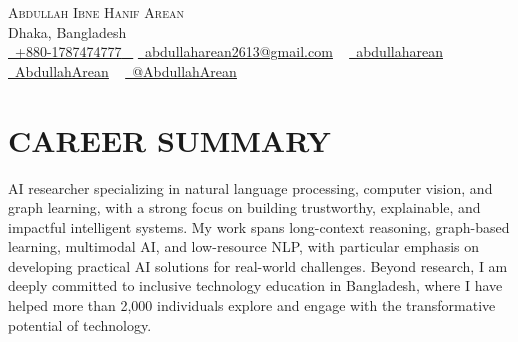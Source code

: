\documentclass[letterpaper,11pt]{article}
\begin{document}
\begin{center}
    {\Huge \scshape Abdullah Ibne Hanif Arean} \\ \vspace{1pt}
    Dhaka, Bangladesh \\ \vspace{1pt}
    \small \href{tel:+8801787474777}{ \raisebox{-0.1\height}\faPhone\ \underline{+880-1787474777} ~} \href{mailto:abdullaharean2613@gmail.com}{\raisebox{-0.2\height}\faEnvelope\  \underline{abdullaharean2613@gmail.com}} ~ 
    \href{https://linkedin.com/in/abdullaharean}{\raisebox{-0.2\height}\faLinkedin\ \underline{abdullaharean}}  ~
    \href{https://github.com/AbdullahArean}{\raisebox{-0.2\height}\faGithub\ \underline{AbdullahArean}} ~
    \href{https://twitter.com/AbdullahArean}{\raisebox{-0.2\height}\faTwitter\ \underline{@AbdullahArean}}
    \vspace{-8pt}
\end{center}





\section{CAREER SUMMARY}
AI researcher specializing in natural language processing, computer vision, and graph learning, with a strong focus on building trustworthy, explainable, and impactful intelligent systems. My work spans long-context reasoning, graph-based learning, multimodal AI, and low-resource NLP, with particular emphasis on developing practical AI solutions for real-world challenges. Beyond research, I am deeply committed to inclusive technology education in Bangladesh, where I have helped more than 2,000 individuals explore and engage with the transformative potential of technology.
\end{document}
